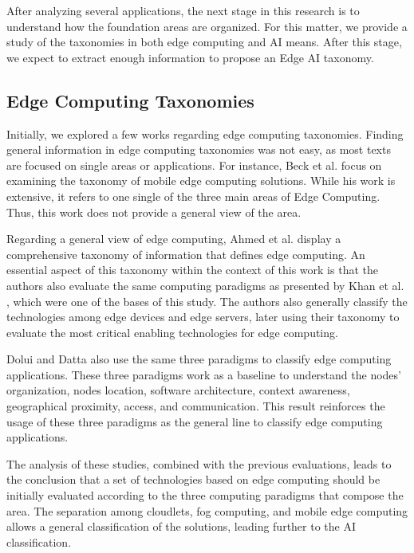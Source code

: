 After analyzing several applications, the next stage in this research is to understand how the foundation areas are organized. For this matter, we provide a study of the taxonomies in both edge computing and AI means. After this stage, we expect to extract enough information to propose an Edge AI taxonomy.

\subsection{Edge Computing Taxonomies}

Initially, we explored a few works regarding edge computing taxonomies. Finding general information in edge computing taxonomies was not easy, as most texts are focused on single areas or applications. For instance, Beck et al. \cite{beck2014mobile} focus on examining the taxonomy of mobile edge computing solutions. While his work is extensive, it refers to one single of the three main areas of Edge Computing. Thus, this work does not provide a general view of the area.

Regarding a general view of edge computing, Ahmed et al. \cite{ahmed2017bringing} display a comprehensive taxonomy of information that defines edge computing. An essential aspect of this taxonomy within the context of this work is that the authors also evaluate the same computing paradigms as presented by Khan et al. \cite{khan2019edge}, which were one of the bases of this study. The authors also generally classify the technologies among edge devices and edge servers, later using their taxonomy to evaluate the most critical enabling technologies for edge computing.

Dolui and Datta \cite{dolui2017comparison} also use the same three paradigms to classify edge computing applications. These three paradigms work as a baseline to understand the nodes' organization, nodes location, software architecture, context awareness, geographical proximity, access, and communication. This result reinforces the usage of these three paradigms as the general line to classify edge computing applications.

The analysis of these studies, combined with the previous evaluations, leads to the conclusion that a set of technologies based on edge computing should be initially evaluated according to the three computing paradigms that compose the area. The separation among cloudlets, fog computing, and mobile edge computing allows a general classification of the solutions, leading further to the AI classification.

